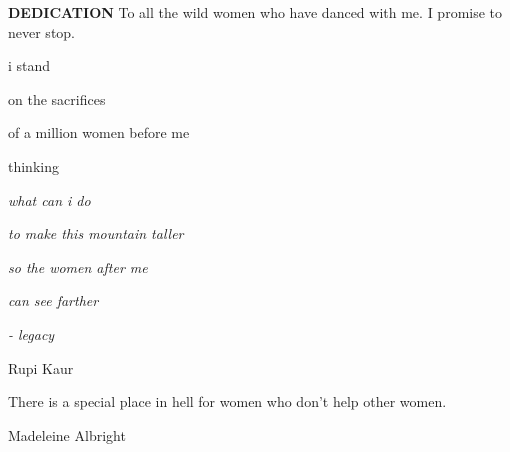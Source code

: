 
\clearpage


\begin{center}
{\textbf{DEDICATION}}
\hspace{0pt}
\vfill
To all the wild women who have danced with me. I promise to never stop. 
\vfill


\raggedright{i stand} \\
\raggedright{on the sacrifices} \\
\raggedright{of a million women before me} \\
\raggedright{thinking} \\
\raggedright{\textit{what can i do}} \\
\raggedright{\textit{to make this mountain taller}} \\
\raggedright{\textit{so the women after me}} \\
\raggedright{\textit{can see farther}} \\
\raggedright{\textit{- legacy}} \\
\raggedright{Rupi Kaur}

\vfill
\raggedright{There is a special place in hell for women who don't help other women.} \\
\raggedright{Madeleine Albright}
\vfill
\hspace{0pt}
\end{center}

